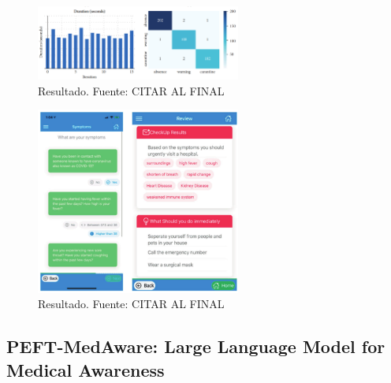 	\begin{figure}[h]
		\begin{center}
			\includegraphics[width=0.6\textwidth]{2/1_antecedentes/Resultado2-1.png}
		\caption{Resultado. Fuente: CITAR AL FINAL }
	\end{center}
	\end{figure}
	
	\begin{figure}[h]
		\begin{center}
			\includegraphics[width=0.6\textwidth]{2/1_antecedentes/Resultado3-1.png}
		\caption{Resultado. Fuente: CITAR AL FINAL }
	\end{center}
	\end{figure}
	

\subsection{PEFT-MedAware: Large Language Model for Medical Awareness}
